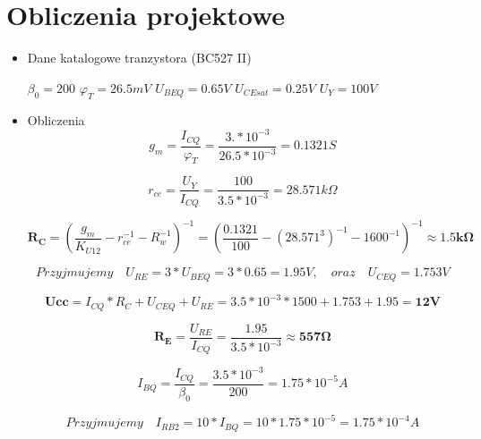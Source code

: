 \documentclass[a4paper,12pt]{article}
\begin{document}
\section{Obliczenia projektowe}
\begin{itemize}
 \item Dane katalogowe tranzystora (BC527 II)

 $\beta_0  = 200 $\newline
 $\varphi_T = 26.5mV$ \newline
 $U_{BEQ}=0.65V$ \newline
 $U_{CEsat}=0.25V$ \newline
 $U_Y = 100V$
 
 \item Obliczenia
\begin{equation}
g_m = \frac{I_{CQ}}{\varphi_T} = \frac{3.*10^{-3}}{26.5*10^{-3}} = 0.1321S
\end{equation}

\begin{equation}
r_{ce} = \frac{U_Y}{I_{CQ}} = \frac{100}{3.5*10^{-3}} = 28.571k\Omega
\end{equation}

\begin{equation}
\mathbf{R_C} = (\frac{g_m}{K_{U12}} - r_{ce}^{-1} - R_w^{-1})^{-1} = (\frac{0.1321}{100} - (28.571^3)^{-1} - 1600^{-1})^{-1} \approx \mathbf{1.5 k\Omega}
\end{equation}

\begin{equation}
Przyjmujemy \quad U_{RE} = 3*U_{BEQ} = 3*0.65 = 1.95V, \quad oraz \quad U_{CEQ} = 1.753V
\end{equation}

\begin{equation}
\mathbf{Ucc} = I_{CQ}*R_C + U_{CEQ} + U_{RE} = 3.5*10^{-3}*1500 + 1.753 + 1.95 = \mathbf{12V}
\end{equation}

\begin{equation}
\mathbf{R_E} = \frac{U_{RE}}{I_{CQ}} = \frac{1.95}{3.5*10^{-3}} \approx \mathbf{557\Omega}
\end{equation}

\begin{equation}
I_{BQ} = \frac{I_{CQ}}{\beta_0} = \frac{3.5*10^{-3}}{200} = 1.75*10^{-5}A
\end{equation}

\begin{equation}
Przyjmujemy \quad I_{RB2} = 10*I_{BQ} = 10 * 1.75*10^{-5} = 1.75*10^{-4}A
\end{equation}


\end{itemize}
\end{document}
